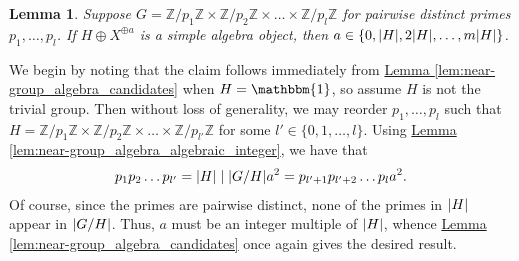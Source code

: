 \documentclass[12pt, reqno]{amsart}
\numberwithin{equation}{section}
\theoremstyle{plainspace}
\newtheorem{lemma}[theorem]{Lemma}
\theoremstyle{definitionspace}
\theoremstyle{remarkspace}
\newtheorem{remark}[theorem]{Remark}
\renewenvironment{proof}{{\noindent\textbf{Proof.}}}{\null\hfill\qedsymbol}
\DeclarePairedDelimiter{\abs}{\lvert}{\rvert}
\newcommand{\mathcat}[1]{\mathcal{#1}}
\begin{document}

\begin{lemma}\label{lem:near-group_algebras_distinct_primes_general}
Suppose $G = \mathbb{Z}/p_1\mathbb{Z} \times \mathbb{Z}/p_2\mathbb{Z} \times \dots \times \mathbb{Z}/p_l\mathbb{Z}$ for pairwise distinct primes $p_1, \dots, p_l$. If $H \oplus X^{\oplus a}$ is a simple algebra object, then $a \in \{0, \abs{H}, 2\abs{H}, \dots, m\abs{H}\}$.
\end{lemma}
\leavevmode\newline
\begin{proof}
\noindent We begin by noting that the claim follows immediately from \hyperref[lem:near-group_algebra_candidates]{Lemma \ref*{lem:near-group_algebra_candidates}} when $H = \mathbbm{1}$, so assume $H$ is not the trivial group. Then without loss of generality, we may reorder $p_1, \dots, p_l$ such that $H = \mathbb{Z}/p_1\mathbb{Z} \times \mathbb{Z}/p_2\mathbb{Z} \times \dots \times \mathbb{Z}/p_{l'}\mathbb{Z}$ for some $l' \in \{0, 1, \dots, l\}$. Using \hyperref[lem:near-group_algebra_algebraic_integer]{Lemma \ref*{lem:near-group_algebra_algebraic_integer}}, we have that
\begin{align*}
\begin{split}
p_1 p_2 \dots p_{l'} = \abs{H} \mid \abs{G/H}a^2 = p_{l'+1} p_{l'+2} \dots p_l a^2.
\end{split}
\end{align*}
\noindent Of course, since the primes are pairwise distinct, none of the primes in $\abs{H}$ appear in $\abs{G/H}$. Thus, $a$ must be an integer multiple of $\abs{H}$, whence \hyperref[lem:near-group_algebra_candidates]{Lemma \ref*{lem:near-group_algebra_candidates}} once again gives the desired result.
\end{proof}
\newline
\end{document}
